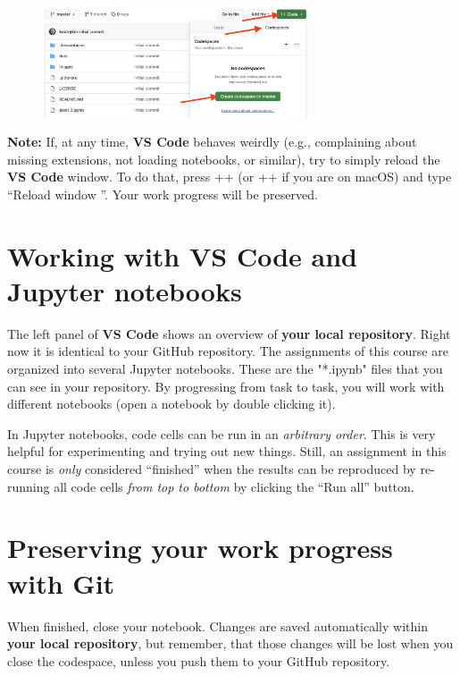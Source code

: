 \documentclass[12pt,a4paper]{article}
\begin{document}
\vspace{-1em}
\begin{figure}[h!]
    \centering
    \includegraphics[width=0.7\textwidth]{images/codespaces.png}
\end{figure}

\textbf{Note:} If, at any time, \textbf{VS Code} behaves weirdly (e.g., complaining about missing extensions, not loading notebooks, or similar), try to simply reload the \textbf{VS Code} window. To do that, press \Ctrl+\keystroke{\shift}+ (or \keystroke{\cmd}+\keystroke{\shift}+ if you are on macOS) and type ``Reload window \Return''. Your work progress will be preserved.

\section{Working with VS Code and Jupyter notebooks}
\label{task:jupyter}

The left panel of \textbf{VS Code} shows an overview of \textbf{your local repository}. Right now it is identical to your GitHub repository. The assignments of this course are organized into several Jupyter notebooks. These are the "*.ipynb" files that you can see in your repository. By progressing from task to task, you will work with different notebooks (open a notebook by double clicking it).

In Jupyter notebooks, code cells can be run in an \emph{arbitrary order}. This is very helpful for experimenting and trying out new things. Still, an assignment in this course is \emph{only} considered ``finished'' when the results can be reproduced by re-running all code cells \emph{from top to bottom} by clicking the ``Run all'' button.

\section{Preserving your work progress with Git}
\label{task:git}

When finished, close your notebook. Changes are saved automatically within \textbf{your local repository}, but remember, that those changes will be lost when you close the codespace, unless you push them to your GitHub repository.
\end{document}
